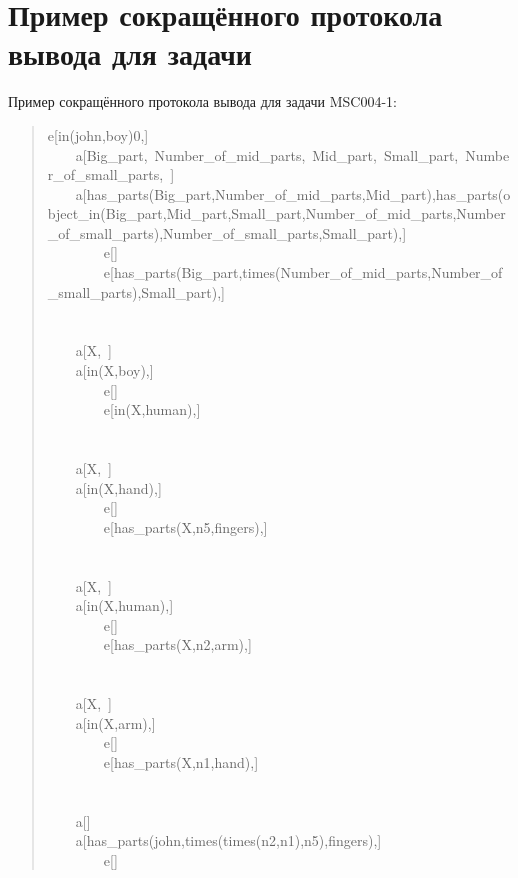 \section*{Пример сокращённого протокола вывода для задачи}
Пример сокращённого протокола вывода для задачи MSC004-1:
\begin{quote}
\tt\raggedright\noindent
e[in(john,boy)0,]\\
~~~~a[Big\_part,~Number\_of\_mid\_parts,~Mid\_part,~Small\_part,~Number\_of\_small\_parts,~]\\
~~~~a[has\_parts(Big\_part,Number\_of\_mid\_parts,Mid\_part),has\_parts(object\_in(Big\_part,Mid\_part,Small\_part,Number\_of\_mid\_parts,Number\_of\_small\_parts),Number\_of\_small\_parts,Small\_part),]\\
~~~~~~~~e[]\\
~~~~~~~~e[has\_parts(Big\_part,times(Number\_of\_mid\_parts,Number\_of\_small\_parts),Small\_part),]\\
~\\
~\\
~~~~a[X,~]\\
~~~~a[in(X,boy),]\\
~~~~~~~~e[]\\
~~~~~~~~e[in(X,human),]\\
~\\
~\\
~~~~a[X,~]\\
~~~~a[in(X,hand),]\\
~~~~~~~~e[]\\
~~~~~~~~e[has\_parts(X,n5,fingers),]\\
~\\
~\\
~~~~a[X,~]\\
~~~~a[in(X,human),]\\
~~~~~~~~e[]\\
~~~~~~~~e[has\_parts(X,n2,arm),]\\
~\\
~\\
~~~~a[X,~]\\
~~~~a[in(X,arm),]\\
~~~~~~~~e[]\\
~~~~~~~~e[has\_parts(X,n1,hand),]\\
~\\
~\\
~~~~a[]\\
~~~~a[has\_parts(john,times(times(n2,n1),n5),fingers),]\\
~~~~~~~~e[]\\

\end{quote}
